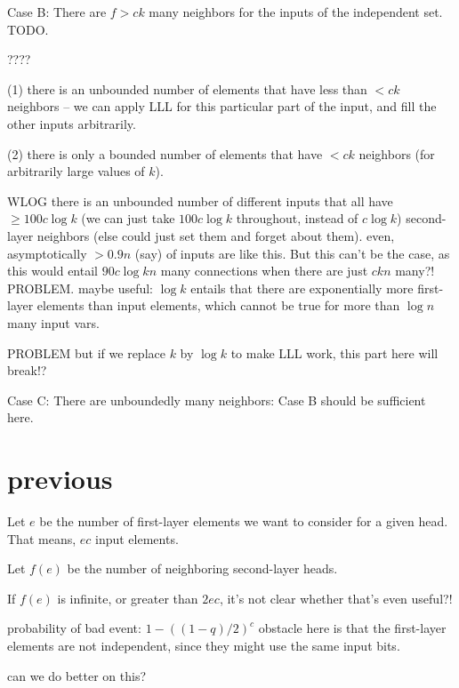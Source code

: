 \documentclass[11pt,a4paper]{article}
\begin{document}
Case B: There are $f > ck$ many neighbors for the inputs of the independent set.
TODO.

????

(1) there is an unbounded number of elements that have less than $< ck$ neighbors -- we can apply LLL for this particular part of the input, and fill the other inputs arbitrarily.

(2) there is only a bounded number of elements that have $< ck$ neighbors (for arbitrarily large values of $k$). 

WLOG there is an unbounded number of different inputs that all have $\geq 100c \log k$ (we can just take $100c \log k$ throughout, instead of $c \log k$) second-layer neighbors (else could just set them and forget about them). even, asymptotically $>0.9n$ (say) of inputs are like this. But this can't be the case, as this would entail $90c \log k n$ many connections when there are just $ckn$ many?! PROBLEM. maybe useful: $\log k$ entails that there are exponentially more first-layer elements than input elements, which cannot be true for more than $\log n$ many input vars.  

PROBLEM but if we replace $k$ by $\log k$ to make LLL work, this part here will break!?

Case C: There are unboundedly many neighbors: Case B should be sufficient here.



\section{previous}



Let $e$ be the number of first-layer elements we want to consider for a given head.
That means, $ec$ input elements.

Let $f(e)$ be the number of neighboring second-layer heads. 

If $f(e)$ is infinite, or greater than $2ec$, it's not clear whether that's even useful?!

probability of bad event:
$1-((1-q)/2)^{c}$
obstacle here is that the first-layer elements are not independent, since they might use the same input bits.

can we do better on this?

\end{document}
